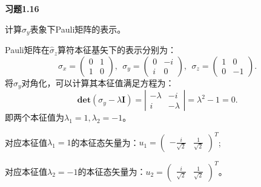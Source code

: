 \documentclass[reqno,a4paper,12pt]{amsart}
\begin{document}
\textbf{习题1.16}

计算$\hat{\sigma}_y$表象下Pauli矩阵的表示。
\begin{tcolorbox}[breakable, colback = black!5!white, colframe = black]
Pauli矩阵在$\hat{\sigma}_z$算符本征基矢下的表示分别为：
\[
	\sigma_x = \left(
	\begin{matrix}
		0 & 1 \\
		1 & 0
	\end{matrix}\right), ~~
	\sigma_y = \left(
	\begin{matrix}
		0 & -i \\
		i & 0
	\end{matrix}\right), ~~
	\sigma_z = \left(
	\begin{matrix}
		1 & 0 \\
		0 & -1
	\end{matrix}\right).
\]
将$\sigma_y$对角化，可以计算其本征值满足方程为：
\[
	\mathbf{det}(\sigma_y - \lambda \mathbf{I}) = \left\vert 
	\begin{matrix}
		-\lambda & -i \\
		i & -\lambda
	\end{matrix}\right\vert = \lambda^2 - 1 = 0.
\]
即两个本征值为$\lambda_1 = 1, \lambda_2 = -1$。

对应本征值$\lambda_1 = 1$的本征态矢量为：$u_1 = \left(\begin{matrix} -\frac{i}{\sqrt{2}} & \frac{1}{\sqrt{2}} \end{matrix}\right)^T$;

对应本征值$\lambda_2 = -1$的本征态矢量为：$u_2 = \left(\begin{matrix} \frac{i}{\sqrt{2}} & \frac{1}{\sqrt{2}} \end{matrix}\right)^T$。


\end{tcolorbox}
\end{document}
